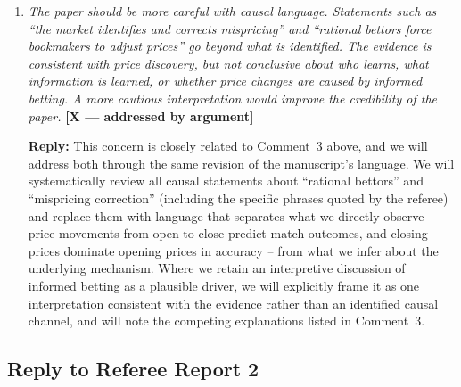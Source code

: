 \documentclass[letterpaper,12pt]{article}
\newcounter{b}
\newcommand{\argX}{\textcolor{green!55!black}{\textbf{[X --- addressed by argument]}}}
\newcommand{\Reply}[1]{\par\noindent\textbf{Reply:} #1}
\begin{document}
\begin{enumerate}
\item \textit{The paper should be more careful with causal language. Statements such as “the
market identifies and corrects mispricing” and “rational bettors force bookmakers to
adjust prices” go beyond what is identified. The evidence is consistent with price discovery, but not conclusive about who learns, what information is learned, or whether price changes are caused by informed betting. A more cautious interpretation would
improve the credibility of the paper.} \argX

\Reply{This concern is closely related to Comment~3 above, and we will address both through the same revision of the manuscript's language. We will systematically review all causal statements about ``rational bettors'' and ``mispricing correction'' (including the specific phrases quoted by the referee) and replace them with language that separates what we directly observe -- price movements from open to close predict match outcomes, and closing prices dominate opening prices in accuracy -- from what we infer about the underlying mechanism. Where we retain an interpretive discussion of informed betting as a plausible driver, we will explicitly frame it as one interpretation consistent with the evidence rather than an identified causal channel, and will note the competing explanations listed in Comment~3.}


\end{enumerate}

\newpage
\subsection*{Reply to Referee Report 2}
\end{document}
